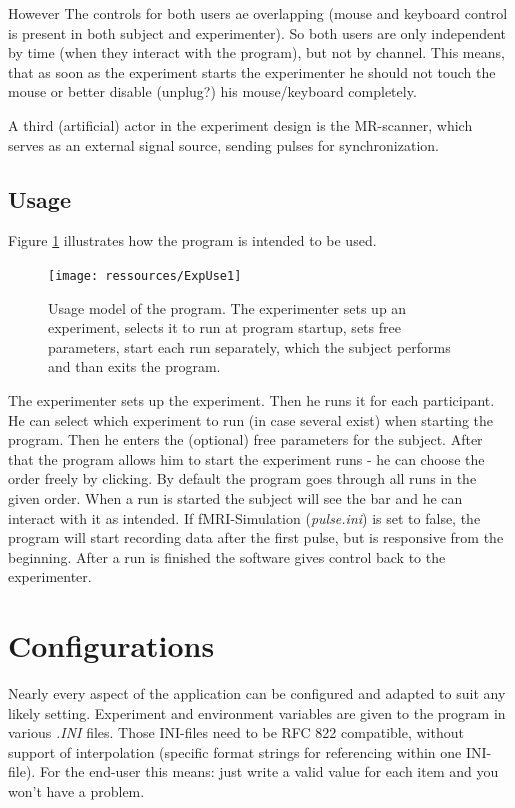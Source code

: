 \documentclass[12pt,a4paper]{book}
\begin{document}
However The controls for both users ae overlapping (mouse and keyboard control is present in both subject and experimenter). So both users are only independent by time (when they interact with the program), but not by channel. This means, that as soon as the experiment starts the experimenter he should not touch the mouse or better disable (unplug?) his mouse/keyboard completely.

A third (artificial) actor in the experiment design is the MR-scanner, which serves as an external signal source, sending pulses for synchronization.

\section{Usage}

Figure \ref{fig:use} illustrates how the program is intended to be used.

\begin{figure}
	\texttt{[image: ressources/ExpUse1]}
	\caption{Usage model of the program. The experimenter sets up an experiment, selects it to run at program startup, sets free parameters, start each run separately, which the subject performs and than exits the program.}
	\label{fig:use}
\end{figure}

The experimenter sets up the experiment. Then he runs it for each participant. He can select which experiment to run (in case several exist) when starting the program. Then he enters the (optional) free parameters for the subject. After that the program allows him to start the experiment runs - he can choose the order freely by clicking. By default the program goes through all runs in the given order. When a run is started the subject will see the bar and he can interact with it as intended. If fMRI-Simulation (\textit{pulse.ini}) is set to false, the program will start recording data after the first pulse, but is responsive from the beginning. After a run is finished the software gives control back to the experimenter.

\chapter{Configurations}

Nearly every aspect of the application can be configured and adapted to suit any likely setting. Experiment and environment variables are given to the program in various \textit{.INI} files. Those INI-files need to be RFC 822 compatible, without support of interpolation (specific format strings for referencing within one INI-file). For the end-user this means: just write a valid value for each item and you won't have a problem.
\end{document}
